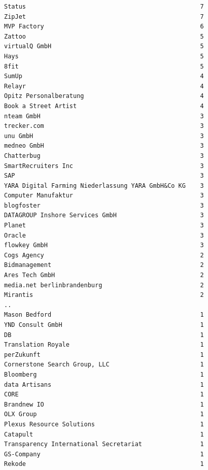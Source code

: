 \documentclass[11pt]{article}
\begin{document}
\begin{enumerate}
\begin{verbatim}
Status                                                7
ZipJet                                                7
MVP Factory                                           6
Zattoo                                                5
virtualQ GmbH                                         5
Hays                                                  5
8fit                                                  5
SumUp                                                 4
Relayr                                                4
Opitz Personalberatung                                4
Book a Street Artist                                  4
nteam GmbH                                            3
trecker.com                                           3
unu GmbH                                              3
medneo GmbH                                           3
Chatterbug                                            3
SmartRecruiters Inc                                   3
SAP                                                   3
YARA Digital Farming Niederlassung YARA GmbH&Co KG    3
Computer Manufaktur                                   3
blogfoster                                            3
DATAGROUP Inshore Services GmbH                       3
Planet                                                3
Oracle                                                3
flowkey GmbH                                          3
Cogs Agency                                           2
Bidmanagement                                         2
Ares Tech GmbH                                        2
media.net berlinbrandenburg                           2
Mirantis                                              2
..
Mason Bedford                                         1
YND Consult GmbH                                      1
DB                                                    1
Translation Royale                                    1
perZukunft                                            1
Cornerstone Search Group, LLC                         1
Bloomberg                                             1
data Artisans                                         1
CORE                                                  1
Brandnew IO                                           1
OLX Group                                             1
Plexus Resource Solutions                             1
Catapult                                              1
Transparency International Secretariat                1
GS-Company                                            1
Rekode                                                1

\end{verbatim}
\end{enumerate}
\end{document}
